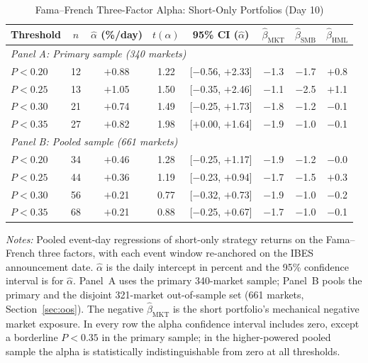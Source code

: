\documentclass[11pt]{article}
\begin{document}
\begin{table}[htbp]
\centering
\begin{threeparttable}
\caption{Fama--French Three-Factor Alpha: Short-Only Portfolios (Day 10)}
\label{tab:ff3}
\begin{tabular}{lccccccc}
\toprule
Threshold & $n$ & $\hat{\alpha}$ (\%/day) & $t(\alpha)$ & 95\% CI ($\hat{\alpha}$) & $\hat{\beta}_{\text{MKT}}$ & $\hat{\beta}_{\text{SMB}}$ & $\hat{\beta}_{\text{HML}}$ \\
\midrule
\multicolumn{8}{l}{\textit{Panel A: Primary sample (340 markets)}} \\
$P < 0.20$ & 12 & $+$0.88 & 1.22 & [$-$0.56, $+$2.33] & $-$1.3 & $-$1.7 & $+$0.8 \\
$P < 0.25$ & 13 & $+$1.05 & 1.50 & [$-$0.35, $+$2.46] & $-$1.1 & $-$2.5 & $+$1.1 \\
$P < 0.30$ & 21 & $+$0.74 & 1.49 & [$-$0.25, $+$1.73] & $-$1.8 & $-$1.2 & $-$0.1 \\
$P < 0.35$ & 27 & $+$0.82 & 1.98 & [$+$0.00, $+$1.64] & $-$1.9 & $-$1.0 & $-$0.1 \\
\midrule
\multicolumn{8}{l}{\textit{Panel B: Pooled sample (661 markets)}} \\
$P < 0.20$ & 34 & $+$0.46 & 1.28 & [$-$0.25, $+$1.17] & $-$1.9 & $-$1.2 & $-$0.0 \\
$P < 0.25$ & 44 & $+$0.36 & 1.19 & [$-$0.23, $+$0.94] & $-$1.7 & $-$1.5 & $+$0.3 \\
$P < 0.30$ & 56 & $+$0.21 & 0.77 & [$-$0.32, $+$0.73] & $-$1.9 & $-$1.0 & $-$0.2 \\
$P < 0.35$ & 68 & $+$0.21 & 0.88 & [$-$0.25, $+$0.67] & $-$1.7 & $-$1.0 & $-$0.1 \\
\bottomrule
\end{tabular}
\begin{tablenotes}
\small
\item \textit{Notes:} Pooled event-day regressions of short-only strategy returns on the Fama--French three factors, with each event window re-anchored on the IBES announcement date. $\hat{\alpha}$ is the daily intercept in percent and the 95\% confidence interval is for $\hat{\alpha}$. Panel~A uses the primary 340-market sample; Panel~B pools the primary and the disjoint 321-market out-of-sample set (661 markets, Section~\ref{sec:oos}). The negative $\hat{\beta}_{\text{MKT}}$ is the short portfolio's mechanical negative market exposure. In every row the alpha confidence interval includes zero, except a borderline $P < 0.35$ in the primary sample; in the higher-powered pooled sample the alpha is statistically indistinguishable from zero at all thresholds.
\end{tablenotes}
\end{threeparttable}
\end{table}
\end{document}
